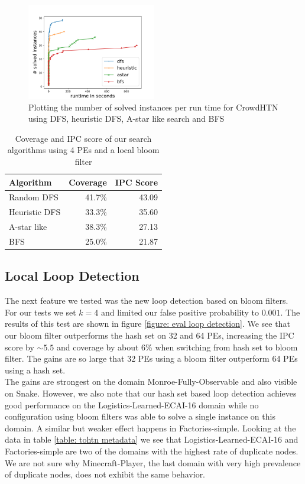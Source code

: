 \begin{figure}[!hbp]
	\caption{Plotting the number of solved instances per run time for CrowdHTN using DFS, heuristic DFS, A-star like search and BFS}
	\label{figure: eval algorithm}
	\centering
	\includegraphics[width=0.5\textwidth]{images/final/search_algorithms.png}
\end{figure}
\begin{table}[!hbp]
	\caption{Coverage and IPC score of our search algorithms using 4 PEs and a local bloom filter}
	\label{table: eval algorithm}
	\centering
	\begin{tabular}{| l | r | r |}
		\hline
		Algorithm 		& Coverage & IPC Score \\
		\hline
		Random DFS 		& 41.7\%	& 43.09 \\ %
		Heuristic DFS 	& 33.3\%	& 35.60	\\ %
		A-star like 	& 38.3\%	& 27.13 \\ %
		BFS 			& 25.0\%	& 21.87	\\ %
		\hline
	\end{tabular}
\end{table}

\subsection{Local Loop Detection}
\label{eval: loop detection}
The next feature we tested was the new loop detection based on bloom filters. For our tests we set $k=4$ and limited our false positive probability to $0.001$. The results of this test are shown in figure \ref{figure: eval loop detection}. We see that our bloom filter outperforms the hash set on 32 and 64 PEs, increasing the IPC score by $\sim 5.5$ and coverage by about 6\% when switching from hash set to bloom filter. The gains are so large that 32 PEs using a bloom filter outperform 64 PEs using a hash set. \\
The gains are strongest on the domain Monroe-Fully-Observable and also visible on Snake.
However, we also note that our hash set based loop detection achieves good performance on the Logistics-Learned-ECAI-16 domain while no configuration using bloom filters was able to solve a single instance on this domain. A similar but weaker effect happens in Factories-simple.
Looking at the data in table \ref{table: tohtn metadata} we see that Logistics-Learned-ECAI-16 and Factories-simple are two of the domains with the highest rate of duplicate nodes. We are not sure why Minecraft-Player, the last domain with very high prevalence of duplicate nodes, does not exhibit the same behavior.

